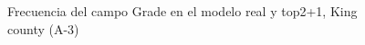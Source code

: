 \begin{figure}[H]
    \centering
    
    \caption{Frecuencia del campo Grade en el modelo real y top2+1, King county (A-3)}
    \label{frecuency-top2+1-grade}
\end{figure}